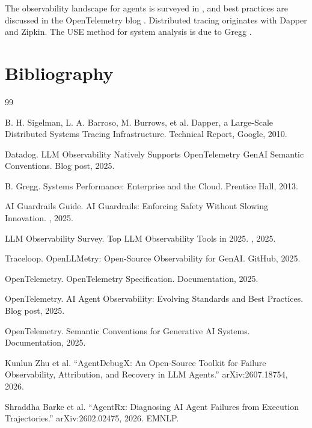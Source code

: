 \documentclass[11pt]{book}
\begin{document}
The observability landscape for agents is surveyed in \cite{llmobs2025}, and best practices are discussed in the OpenTelemetry blog \cite{otelagent2025}. Distributed tracing originates with Dapper \cite{dapper2010} and Zipkin. The USE method for system analysis is due to Gregg \cite{gregg2013}.

\section*{Bibliography}

\begin{thebibliography}{99}

B. H. Sigelman, L. A. Barroso, M. Burrows, et al.
\newblock Dapper, a Large-Scale Distributed Systems Tracing Infrastructure.
\newblock Technical Report, Google, 2010.

Datadog.
\newblock LLM Observability Natively Supports OpenTelemetry GenAI Semantic Conventions.
\newblock Blog post, 2025.

B. Gregg.
\newblock Systems Performance: Enterprise and the Cloud.
\newblock Prentice Hall, 2013.

AI Guardrails Guide.
\newblock AI Guardrails: Enforcing Safety Without Slowing Innovation.
, 2025.

LLM Observability Survey.
\newblock Top LLM Observability Tools in 2025.
, 2025.

Traceloop.
\newblock OpenLLMetry: Open-Source Observability for GenAI.
\newblock GitHub, 2025.

OpenTelemetry.
\newblock OpenTelemetry Specification.
\newblock Documentation, 2025.

OpenTelemetry.
\newblock AI Agent Observability: Evolving Standards and Best Practices.
\newblock Blog post, 2025.

OpenTelemetry.
\newblock Semantic Conventions for Generative AI Systems.
\newblock Documentation, 2025.


Kunlun Zhu et al.
``AgentDebugX: An Open-Source Toolkit for Failure Observability, Attribution, and Recovery in LLM Agents.''
arXiv:2607.18754, 2026.

Shraddha Barke et al.
``AgentRx: Diagnosing AI Agent Failures from Execution Trajectories.''
arXiv:2602.02475, 2026. EMNLP.


\end{thebibliography}
\end{document}
